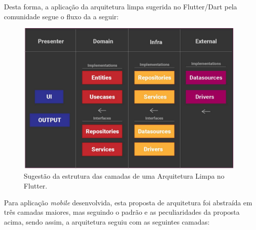  Desta forma, a aplicação da arquitetura limpa sugerida no Flutter/Dart pela comunidade \cite{flutterando_clean_dart} segue o fluxo da  a seguir:

\begin{figure}[H]
\centering
  \includegraphics[width=0.8\columnwidth]{images/clean_dart2.pdf}
  \caption{Sugestão da estrutura das camadas de uma Arquitetura Limpa no Flutter.}
  \label{fig:clean_dart2}
\end{figure}

Para aplicação \textit{mobile} desenvolvida, esta proposta de arquitetura foi abstraída em três camadas maiores, mas seguindo o padrão e as peculiaridades da proposta acima, sendo assim, a arquitetura seguiu com as seguintes camadas:


